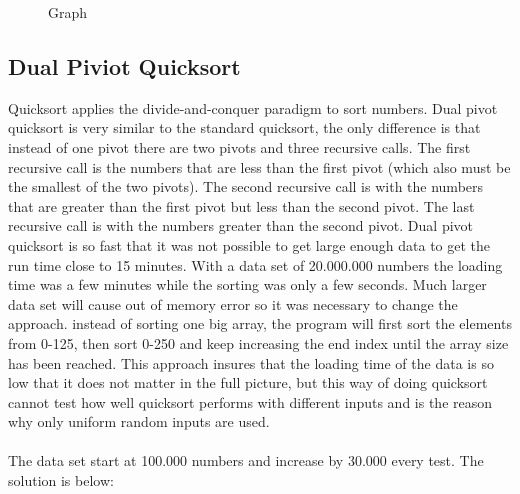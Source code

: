 \documentclass[a4paper, 11pt, titlepage]{article}
\begin{document}
\begin{figure}[H]
	\centering
	\caption{Graph}
	\label{graph}
\end{figure}

\subsection{Dual Piviot Quicksort}
Quicksort applies the divide-and-conquer paradigm to sort numbers. Dual pivot quicksort is very similar to the standard quicksort, the only difference is that instead of one pivot there are two pivots and three recursive calls. The first recursive call is the numbers that are less than the first pivot (which also must be the smallest of the two pivots). The second recursive call is with the numbers that are greater than the first pivot but less than the second pivot. The last recursive call is with the numbers greater than the second pivot. Dual pivot quicksort is so fast that it was not possible to get large enough data to get the run time close to 15 minutes. With a data set of 20.000.000 numbers the loading time was a few minutes while the sorting was only a few seconds. Much larger data set will cause out of memory error so it was necessary to change the approach. instead of sorting one big array, the program will first sort the elements from 0-125, then sort 0-250 and keep increasing the end index until the array size has been reached. This approach insures that the loading time of the data is so low that it does not matter in the full picture, but this way of doing quicksort cannot test how well quicksort performs with different inputs and is the reason why only uniform random inputs are used. \\
\\
The data set start at 100.000 numbers and increase by 30.000 every test. The solution is below:
\end{document}
